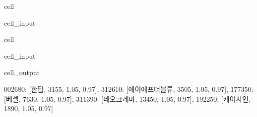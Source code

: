 \documentclass[letterpaper,10pt,english]{jupyterBook}
\begin{document}
\begin{sphinxuseclass}{cell}\begin{sphinxVerbatimInput}

\begin{sphinxuseclass}{cell_input}
\begin{sphinxVerbatim}[commandchars=\\\{\}]
  
   
      \PYG{p}{[}\PYG{p}{]}
    \PYG{p}{[}\PYG{p}{]}  \PYG{p}{[}\PYG{p}{[}\PYG{p}{]} \PYG{p}{[}\PYG{p}{]} \PYG{p}{[}\PYG{p}{]} \PYG{p}{[}\PYG{p}{]}\PYG{p}{]}    
\end{sphinxVerbatim}

\end{sphinxuseclass}\end{sphinxVerbatimInput}

\end{sphinxuseclass}
\begin{sphinxuseclass}{cell}\begin{sphinxVerbatimInput}

\begin{sphinxuseclass}{cell_input}
\begin{sphinxVerbatim}[commandchars=\\\{\}]
\end{sphinxVerbatim}

\end{sphinxuseclass}\end{sphinxVerbatimInput}
\begin{sphinxVerbatimOutput}

\begin{sphinxuseclass}{cell_output}
\begin{sphinxVerbatim}[commandchars=\\\{\}]
\PYGZob{}\PYGZsq{}002680\PYGZsq{}: [\PYGZsq{}한탑\PYGZsq{}, 3155, 1.05, 0.97],
 \PYGZsq{}312610\PYGZsq{}: [\PYGZsq{}에이에프더블류\PYGZsq{}, 3505, 1.05, 0.97],
 \PYGZsq{}177350\PYGZsq{}: [\PYGZsq{}베셀\PYGZsq{}, 7630, 1.05, 0.97],
 \PYGZsq{}311390\PYGZsq{}: [\PYGZsq{}네오크레마\PYGZsq{}, 13450, 1.05, 0.97],
 \PYGZsq{}192250\PYGZsq{}: [\PYGZsq{}케이사인\PYGZsq{}, 1890, 1.05, 0.97]\PYGZcb{}
\end{sphinxVerbatim}

\end{sphinxuseclass}\end{sphinxVerbatimOutput}

\end{sphinxuseclass}






\renewcommand{\indexname}{Index}
\printindex
\end{document}

